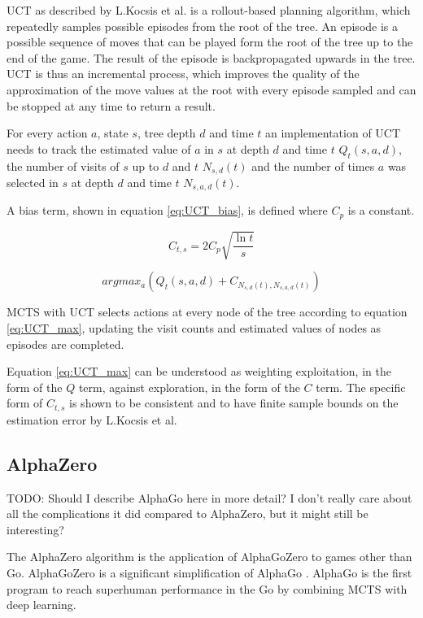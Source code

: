 \documentclass[12pt,onecolumn,oneside,titlepage]{article}
\begin{document}
UCT as described by L.Kocsis et al. is a rollout-based planning algorithm, which repeatedly samples possible episodes from the root of the tree. An episode is a possible sequence of moves that can be played form the root of the tree up to the end of the game. The result
of the episode is backpropagated upwards in the tree.
UCT is thus an incremental process, which improves the quality of the approximation of the move values at the root with every episode sampled and can be stopped at any time to return a result.

For every action $a$, state $s$, tree depth $d$ and time $t$ an implementation of UCT needs to track the estimated value of $a$ in $s$ at depth $d$ and time $t$ $Q_t(s,a,d)$, the number of visits of $s$ up to $d$ and $t$ $N_{s,d}(t)$ and the number of times
$a$ was selected in $s$ at depth $d$ and time $t$ $N_{s,a,d}(t)$.

A bias term, shown in equation \ref{eq:UCT_bias}, is defined where $C_p$ is a constant.

\begin{equation}
 C_{t,s} = 2C_p \sqrt{\frac{\ln t}{s}}\label{eq:UCT_bias}
\end{equation}


\begin{equation}
 argmax_a(Q_t(s,a,d) + C_{N_{s,d}(t), N_{s,a,d}(t)}\label{eq:UCT_max})
\end{equation}

MCTS with UCT selects actions at every node of the tree according to equation \ref{eq:UCT_max}, updating the visit counts and estimated values of nodes as episodes are completed.

Equation \ref{eq:UCT_max} can be understood as weighting exploitation, in the form of the $Q$ term, against exploration, in the form of the $C$ term. The specific form of $C_{t,s}$ is shown to be consistent and to have finite sample bounds on the estimation error by L.Kocsis et al.


\subsection{AlphaZero}

TODO: Should I describe AlphaGo here in more detail? I don't really care about all the complications it did compared to AlphaZero, but it might still be interesting?

The AlphaZero algorithm \cite{silver2018general} is the application of AlphaGoZero \cite{silver2017mastering} to games other than Go. AlphaGoZero is a significant simplification of AlphaGo \cite{silver2016mastering}.
AlphaGo  is the first program to reach superhuman performance in the Go by combining MCTS with deep learning.
\end{document}
